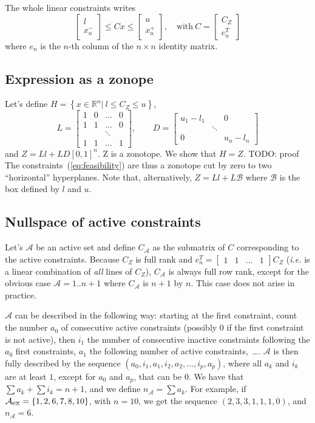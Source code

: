 \documentclass[]{article}
\newcommand{\BIN}{\begin{bmatrix}}
\newcommand{\BOUT}{\end{bmatrix}}
\begin{document}
The whole linear constraints writes
\begin{equation}
  \BIN l \\ x_n^- \BOUT \leq C x \leq \BIN u \\ x_n^+ \BOUT, \quad \mbox{with}\ C = \BIN C_Z \\ e_n^T\BOUT
  \label{eq:feasibility}
\end{equation}
where $e_n$ is the $n$-th column of the $n\times n$ identity matrix.

\subsection{Expression as a zonope}
Let's define $H = \left\{x \in \mathbb{R}^n \vert\ l \leq C_Z \leq u\right\}$, 
\begin{equation}
L = \BIN 1 & 0 & \ldots & 0 \\ 1 & 1 &\ldots & 0 \\ & & \ddots & \\ 1 & 1 &\ldots & 1\BOUT, \qquad D = \BIN u_1 - l_1 & & 0 \\ & \ddots & \\ 0 & & u_n - l_n\BOUT
\end{equation}
and $Z = Ll + LD \left[0,1\right]^n$. Z is a zonotope. We show that $H = Z$.\newline
TODO: proof
\newline
The constraints~(\ref{eq:feasibility}) are thus a zonotope cut by zero to two ``horizontal'' hyperplanes.
Note that, alternatively, $Z = Ll + L \mathcal{B}$ where $\mathcal{B}$ is the box defined by $l$ and $u$.

\subsection{Nullspace of active constraints}
Let's $\mathcal{A}$ be an active set and define $C_\mathcal{A}$ as the submatrix of $C$ corresponding to the active constraints.
Because $C_Z$ is full rank and $e_n^T = \BIN 1 & 1 & \ldots & 1 \BOUT C_Z$ (\emph{i.e.} is a linear combination of \emph{all} lines of $C_Z$), $C_\mathcal{A}$ is always full row rank, except for the obvious case $\mathcal{A} = 1..n+1$ where $C_\mathcal{A}$ is $n+1$ by $n$. This case does not arise in practice.

$\mathcal{A}$ can be described in the following way: starting at the first constraint, count the number $a_0$ of consecutive active constraints (possibly $0$ if the first constraint is not active), then $i_1$ the number of consecutive inactive constraints following the $a_0$ first constraints, $a_1$ the following number of active constraints,~\ldots. $\mathcal{A}$ is then fully described by the sequence $(a_0, i_1, a_1, i_2, a_2, \ldots, i_p, a_p)$, where all $a_k$ and $i_k$ are at least $1$, except for $a_0$ and $a_p$, that can be $0$. We have that $\sum a_k + \sum i_k = n+1$, and we define $n_{\mathcal{A}} = \sum a_k$.
For example, if $\mathcal{A}_{\mbox{\small ex}} = \left\{1, 2, 6, 7, 8, 10\right\}$, with $n=10$, we get the sequence $(2,3,3,1,1,1,0)$, and $n_{\mathcal{A}} = 6$.
\end{document}

